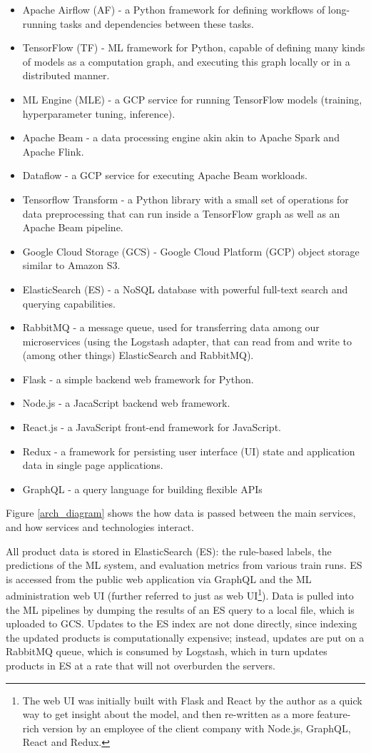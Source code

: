 \begin{itemize}
  \item Apache Airflow (AF) - a Python framework for defining workflows of long-running tasks and dependencies between these tasks.
  \item TensorFlow (TF) - ML framework for Python, capable of defining many kinds of models as a computation graph, and executing this graph locally or in a distributed manner.
  \item ML Engine (MLE) - a GCP service for running TensorFlow models (training, hyperparameter tuning, inference).
  \item Apache Beam - a data processing engine akin akin to Apache Spark and Apache Flink.
  \item Dataflow - a GCP service for executing Apache Beam workloads.
  \item Tensorflow Transform - a Python library with a small set of operations for data preprocessing that can run inside a TensorFlow graph as well as an Apache Beam pipeline.
  \item Google Cloud Storage (GCS) - Google Cloud Platform (GCP) object storage similar to Amazon S3.
  \item ElasticSearch (ES) - a NoSQL database with powerful full-text search and querying capabilities.
  \item RabbitMQ - a message queue, used for transferring data among our microservices (using the Logstash adapter, that can read from and write to (among other things) ElasticSearch and RabbitMQ).
  \item Flask - a simple backend web framework for Python.
  \item Node.js - a JacaScript backend web framework.
  \item React.js - a JavaScript front-end framework for JavaScript.
  \item Redux - a framework for persisting user interface (UI) state and application data in single page applications.
  \item GraphQL - a query language for building flexible APIs
\end{itemize}

Figure \ref{arch_diagram} shows the how data is passed between the main services, and how services and technologies interact.

All product data is stored in ElasticSearch (ES): the rule-based labels, the predictions of the ML system, and evaluation metrics from various train runs.
ES is accessed from the public web application via GraphQL and the ML administration web UI (further referred to just as web UI\footnote{The web UI was initially built with Flask and React by the author as a quick way to get insight about the model, and then re-written as a more feature-rich version by an employee of the client company with Node.js, GraphQL, React and Redux.}).
Data is pulled into the ML pipelines by dumping the results of an ES query to a local file, which is uploaded to GCS.
Updates to the ES index are not done directly, since indexing the updated products is computationally expensive; instead, updates are put on a RabbitMQ queue, which is consumed by Logstash, which in turn updates products in ES at a rate that will not overburden the servers.

